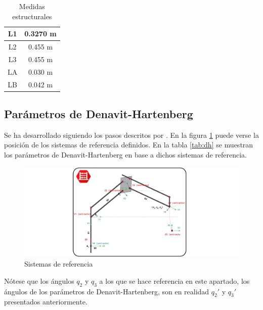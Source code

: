  \begin{table}[H]
    	\caption{Medidas estructurales}
    	\label{tab:medidas}
    	\begin{center}
    		\begin{tabular}{ |c|c| }
    			\hline
    			L1 & 0.3270 m \\
    			\hline
    			L2 & 0.455 m \\
    			\hline
    			L3 & 0.455 m \\
    			\hline
    			LA & 0.030 m \\
    			\hline
    			LB & 0.042 m \\
    			\hline
    		\end{tabular}
    	\end{center}
 \end{table}
	    
\subsection{Parámetros de Denavit-Hartenberg}
	Se ha desarrollado siguiendo los pasos descritos por \cite{barrientos}. En la figura \ref{fig:Control:dh} puede verse la posición de los sistemas de referencia definidos. En la tabla \ref{tab:dh} se muestran los parámetros de Denavit-Hartenberg en base a dichos sistemas de referencia. 
		
	\begin{figure}[H]
		\centering
		\includegraphics[width=1\textwidth]{figuras/Imagenes_cinematica/denavit-hartemberg_virtuales.jpg}
		\caption{Sistemas de referencia}
		\label{fig:Control:dh}
	\end{figure}
	
	Nótese que los ángulos $q_2$ y $q_3$ a los que se hace referencia en este apartado, los ángulos de los parámetros de Denavit-Hartenberg, son en realidad $q_2'$ y $q_3'$ presentados anteriormente.
	
